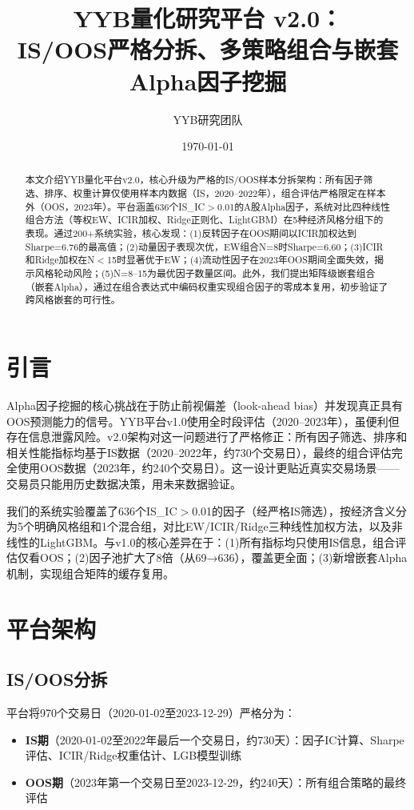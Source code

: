 \documentclass[11pt,a4paper]{ctexart}
\title{\textbf{YYB量化研究平台 v2.0：\\IS/OOS严格分拆、多策略组合与嵌套Alpha因子挖掘}}
\author{YYB研究团队}
\date{\today}
\begin{document}
\maketitle

\begin{abstract}
本文介绍YYB量化平台v2.0，核心升级为严格的IS/OOS样本分拆架构：所有因子筛选、排序、权重计算仅使用样本内数据（IS，2020--2022年），组合评估严格限定在样本外（OOS，2023年）。平台涵盖636个IS\_IC$>$0.01的A股Alpha因子，系统对比四种线性组合方法（等权EW、ICIR加权、Ridge正则化、LightGBM）在5种经济风格分组下的表现。通过200+系统实验，核心发现：(1)反转因子在OOS期间以ICIR加权达到Sharpe=6.76的最高值；(2)动量因子表现次优，EW组合N=8时Sharpe=6.60；(3)ICIR和Ridge加权在N$<$15时显著优于EW；(4)流动性因子在2023年OOS期间全面失效，揭示风格轮动风险；(5)N=8--15为最优因子数量区间。此外，我们提出矩阵级嵌套组合（嵌套Alpha），通过在组合表达式中编码权重实现组合因子的零成本复用，初步验证了跨风格嵌套的可行性。
\end{abstract}

\section{引言}

Alpha因子挖掘的核心挑战在于防止前视偏差（look-ahead bias）并发现真正具有OOS预测能力的信号。YYB平台v1.0使用全时段评估（2020--2023年），虽便利但存在信息泄露风险。v2.0架构对这一问题进行了严格修正：所有因子筛选、排序和相关性能指标均基于IS数据（2020--2022年，约730个交易日），最终的组合评估完全使用OOS数据（2023年，约240个交易日）。这一设计更贴近真实交易场景——交易员只能用历史数据决策，用未来数据验证。

我们的系统实验覆盖了636个IS\_IC$>$0.01的因子（经严格IS筛选），按经济含义分为5个明确风格组和1个混合组，对比EW/ICIR/Ridge三种线性加权方法，以及非线性的LightGBM。与v1.0的核心差异在于：(1)所有指标均只使用IS信息，组合评估仅看OOS；(2)因子池扩大了8倍（从69→636），覆盖更全面；(3)新增嵌套Alpha机制，实现组合矩阵的缓存复用。

\section{平台架构}

\subsection{IS/OOS分拆}

平台将970个交易日（2020-01-02至2023-12-29）严格分为：
\begin{itemize}[nosep]
    \item \textbf{IS期}（2020-01-02至2022年最后一个交易日，约730天）：因子IC计算、Sharpe评估、ICIR/Ridge权重估计、LGB模型训练
    \item \textbf{OOS期}（2023年第一个交易日至2023-12-29，约240天）：所有组合策略的最终评估
\end{itemize}
\end{document}
